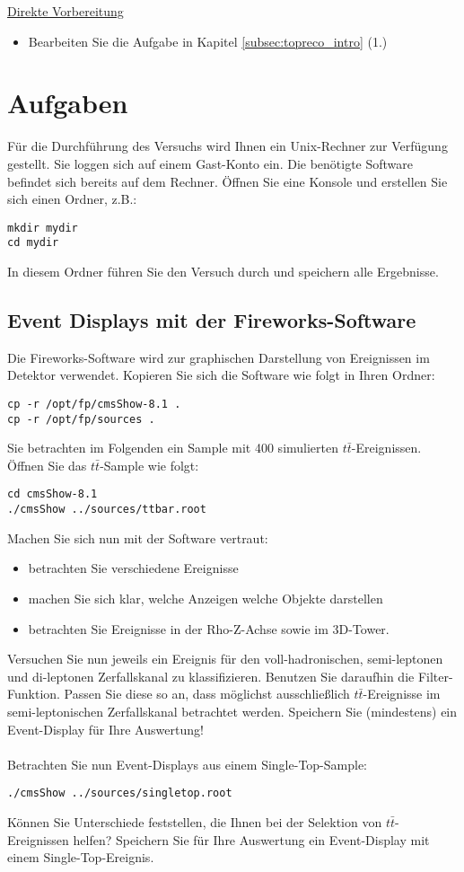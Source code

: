 \underline{Direkte Vorbereitung}
\begin{itemize}
\item Bearbeiten Sie die Aufgabe in Kapitel \ref{subsec:topreco_intro} (1.)
\end{itemize}


\section{Aufgaben}
F\"ur die Durchf\"uhrung des Versuchs wird Ihnen ein Unix-Rechner zur Verf\"ugung gestellt. Sie loggen sich auf einem Gast-Konto ein. Die ben\"otigte Software befindet sich bereits auf dem Rechner. \"Offnen Sie eine Konsole und erstellen Sie sich einen Ordner, z.B.:
\begin{lstlisting}
mkdir mydir
cd mydir
\end{lstlisting}
In diesem Ordner f\"uhren Sie den Versuch durch und speichern alle Ergebnisse.
\subsection{Event Displays mit der Fireworks-Software}
Die Fireworks-Software wird zur graphischen Darstellung von Ereignissen im Detektor verwendet. Kopieren Sie sich die Software wie folgt in Ihren Ordner:
\begin{lstlisting}
cp -r /opt/fp/cmsShow-8.1 .
cp -r /opt/fp/sources .
\end{lstlisting}
Sie betrachten im Folgenden ein Sample mit 400 simulierten $t\bar{t}$-Ereignissen. \"Offnen Sie das $t\bar{t}$-Sample wie folgt:
\begin{lstlisting}
cd cmsShow-8.1
./cmsShow ../sources/ttbar.root
\end{lstlisting}
Machen Sie sich nun mit der Software vertraut:
\begin{itemize}
\item betrachten Sie verschiedene Ereignisse
\item machen Sie sich klar, welche Anzeigen welche Objekte darstellen
\item betrachten Sie Ereignisse in der Rho-Z-Achse sowie im 3D-Tower.
\end{itemize}
Versuchen Sie nun jeweils ein Ereignis f\"ur den voll-hadronischen, semi-leptonen und di-leptonen Zerfallskanal zu klassifizieren. Benutzen Sie daraufhin die Filter-Funktion. Passen Sie diese so an, dass m\"oglichst ausschlie{\ss}lich $t\bar{t}$-Ereignisse im semi-leptonischen Zerfallskanal betrachtet werden. Speichern Sie (mindestens) ein Event-Display f\"ur Ihre Auswertung!\\
\\
Betrachten Sie nun Event-Displays aus einem Single-Top-Sample:
\begin{lstlisting}
./cmsShow ../sources/singletop.root
\end{lstlisting}
K\"onnen Sie Unterschiede feststellen, die Ihnen bei der Selektion von $t\bar{t}$-Ereignissen helfen? Speichern Sie f\"ur Ihre Auswertung ein Event-Display mit einem Single-Top-Ereignis.


